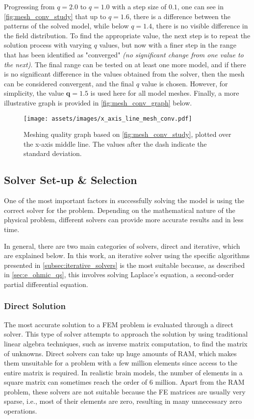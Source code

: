 Progressing from $q=2.0$ to $q=1.0$ with a step size of $0.1$, one can see in \autoref{fig:mesh_conv_study} that up to $q=1.6$, there is a difference between the patterns of the solved model, while below $q=1.4$, there is no visible difference in the field distribution. To find the appropriate value, the next step is to repeat the solution process with varying $q$ values, but now with a finer step in the range that has been identified as "converged" \textit{(no significant change from one value to the next)}. The final range can be tested on at least one more model, and if there is no significant difference in the values obtained from the solver, then the mesh can be considered convergent, and the final $q$ value is chosen. However, for simplicity, the value $\boldsymbol{q=1.5}$ is used here for all model meshes. Finally, a more illustrative graph is provided in \autoref{fig:mesh_conv_graph} below.

\begin{figure}[H]
    \centering
    \texttt{[image: assets/images/x\_axis\_line\_mesh\_conv.pdf]}
    \caption{Meshing quality graph based on \autoref{fig:mesh_conv_study}, plotted over the x-axis middle line. The values after the dash indicate the standard deviation.}
    \label{fig:mesh_conv_graph}
\end{figure}

\subsection{Solver Set-up \& Selection}

One of the most important factors in successfully solving the model is using the correct solver for the problem. Depending on the mathematical nature of the physical problem, different solvers can provide more accurate results and in less time.

In general, there are two main categories of solvers, direct and iterative, which are explained below. In this work, an iterative solver using the specific algorithms presented in \ref{subsec:iterative_solvers} is the most suitable because, as described in \ref{sec:e_ohmic_qs}, this involves solving Laplace's equation, a second-order partial differential equation.

\subsubsection{Direct Solution}

The most accurate solution to a \gls{FEM} problem is evaluated through a direct solver. This type of solver attempts to approach the solution by using traditional linear algebra techniques, such as inverse matrix computation, to find the matrix of unknowns. Direct solvers can take up huge amounts of \gls{RAM}, which makes them unsuitable for a problem with a few million elements since access to the entire matrix is required. In realistic brain models, the number of elements in a square matrix can sometimes reach the order of 6 million. Apart from the \gls{RAM} problem, these solvers are not suitable because the \gls{FE} matrices are usually very sparse, i.e., most of their elements are zero, resulting in many unnecessary zero operations.

